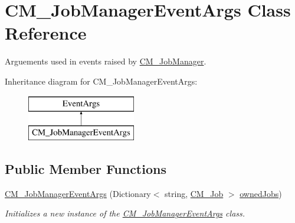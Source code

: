 \hypertarget{class_c_m___job_manager_event_args}{}\section{C\+M\+\_\+\+Job\+Manager\+Event\+Args Class Reference}
\label{class_c_m___job_manager_event_args}


Arguements used in events raised by \hyperlink{class_c_m___job_manager}{C\+M\+\_\+\+Job\+Manager}.  


Inheritance diagram for C\+M\+\_\+\+Job\+Manager\+Event\+Args\+:\begin{figure}[H]
\begin{center}
\leavevmode
\includegraphics[height=2.000000cm]{class_c_m___job_manager_event_args}
\end{center}
\end{figure}
\subsection*{Public Member Functions}
\begin{DoxyCompactItemize}
\item 
\hyperlink{class_c_m___job_manager_event_args_a3bf019737d565f11c527b36e39dff77d}{C\+M\+\_\+\+Job\+Manager\+Event\+Args} (Dictionary$<$ string, \hyperlink{class_c_m___job}{C\+M\+\_\+\+Job} $>$ \hyperlink{class_c_m___job_manager_event_args_ab3f9e101be895139ac984b0a5abe5c55}{owned\+Jobs})
\begin{DoxyCompactList}\small\item\em Initializes a new instance of the \hyperlink{class_c_m___job_manager_event_args}{C\+M\+\_\+\+Job\+Manager\+Event\+Args} class. \end{DoxyCompactList}\end{DoxyCompactItemize}
